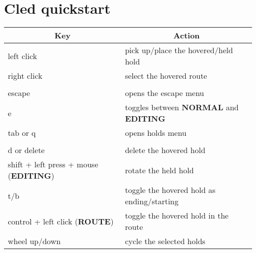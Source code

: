 \chapter{Cled quickstart}

\begin{table}[H]
\begin{tabular}{@{}ll@{}}
\toprule
\multicolumn{1}{c}{\textbf{Key}}     & \multicolumn{1}{c}{\textbf{Action}}           \\ \midrule
left click                           & pick up/place the hovered/held hold           \\
right click                          & select the hovered route                      \\
                                     &                                               \\
escape                               & opens the escape menu                         \\
e                                    & toggles between \textbf{NORMAL} and \textbf{EDITING}\\
tab or q                             & opens holds menu                              \\
                                     &                                               \\
d or delete                          & delete the hovered hold                       \\
shift + left press + mouse (\textbf{EDITING}) & rotate the held hold                          \\
t/b                                  & toggle the hovered hold as ending/starting    \\
control + left click (\textbf{ROUTE})         & toggle the hovered hold in the route \\
wheel up/down                        & cycle the selected holds                      \\ \bottomrule
\end{tabular}
\label{The editor key bindings.}
\end{table}

